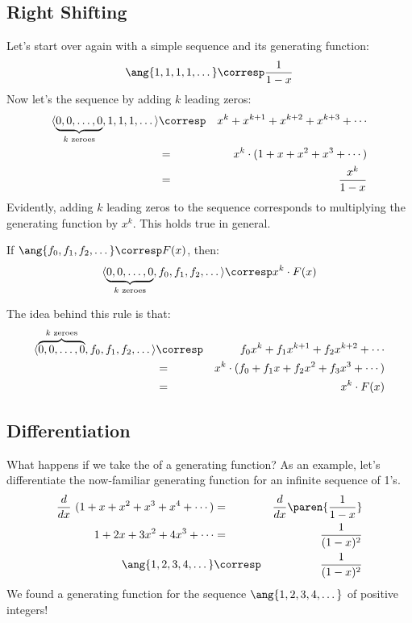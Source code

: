 \subsection{Right Shifting}

Let's start over again with a simple sequence and its generating
function:
%
\[
\ang{1, 1, 1, 1, \dots} \corresp \frac{1}{1-x}
\]
%
Now let's  the sequence by adding $k$ leading
zeros:
%
\begin{eqnarray*}
\langle\underbrace{0, 0, \dots, 0}_{\text{$k$ zeroes}}, 1, 1, 1, \dots\rangle
        & \corresp & x^k + x^{k+1} + x^{k+2} + x^{k+3} + \cdots \\
        & = & x^k \cdot (1  + x + x^2 + x^3 + \cdots) \\
        & = &\frac{x^k}{1-x}
\end{eqnarray*}
%
Evidently, adding $k$ leading zeros to the sequence corresponds to
multiplying the generating function by $x^k$.  This holds true in
general.

\begin{mathrule}
\label{rule:shift}
If $\ang{f_0, f_1, f_2, \dots} \corresp F(x)$, then:
%
\[
\langle \underbrace{0, 0, \dots, 0}_{\text{$k$ zeroes}}, f_0, f_1, f_2, \dots\rangle \corresp x^k \cdot F(x)
\]
\end{mathrule}

The idea behind this rule is that:
\begin{eqnarray*}
\langle\overbrace{0, 0, \dots, 0}^{\text{$k$ zeroes}}, f_0, f_1, f_2, \dots\rangle
 & \corresp & f_0 x^k + f_1 x^{k+1} + f_2 x^{k+2} + \cdots \\
 & = & x^k \cdot (f_0 + f_1 x + f_2 x^2 + f_3 x^3 + \cdots) \\
 & = & x^k \cdot F(x)
\end{eqnarray*}

\subsection{Differentiation}

What happens if we take the  of a generating
function?  As an example, let's differentiate the now-familiar
generating function for an infinite sequence of 1's.
%
\begin{eqnarray}
\frac{d}{dx} \ (1 + x + x^2 + x^3 + x^4 + \cdots)
        & = & \frac{d}{dx} \paren{\frac{1}{1-x}} \notag\\
1 + 2x + 3x^2 + 4x^3 + \cdots & = & \frac{1}{(1-x)^2} \label{sumixi-1}\\
\ang{1, 2, 3, 4, \dots}  & \corresp & \frac{1}{(1-x)^2}\notag
\end{eqnarray}
%
We found a generating function for the sequence $\ang{1, 2, 3, 4,
\dots}$ of positive integers!

